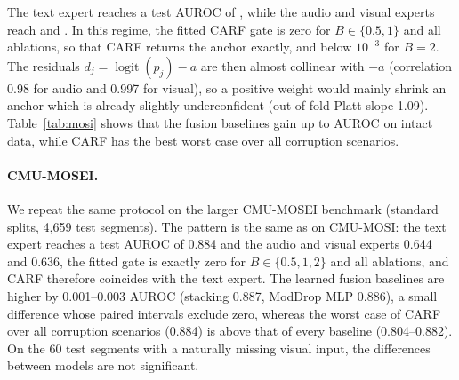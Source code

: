 \documentclass[runningheads]{llncs}
\newcommand{\logit}{\operatorname{logit}}
\begin{document}
The text expert reaches a test AUROC of \MosiText{}, while the audio and visual experts reach \MosiAudio{} and \MosiVisual{}. In this regime, the fitted CARF gate is zero for $B\in\{0.5,1\}$ and all ablations, so that CARF returns the anchor exactly, and below $10^{-3}$ for $B=2$. The residuals $d_j=\logit(p_j)-a$ are then almost collinear with $-a$ (correlation 0.98 for audio and 0.997 for visual), so a positive weight would mainly shrink an anchor which is already slightly underconfident (out-of-fold Platt slope 1.09). Table~\ref{tab:mosi} shows that the fusion baselines gain up to \MosiGap{} AUROC on intact data, while CARF has the best worst case over all corruption scenarios.

\begin{table}[h]
\centering
\caption{CMU-MOSI test results. Permuted: expert output permuted across segments (mean of 30 realizations). Worst case: lowest mean AUROC over the \MosiNScen{} corruption scenarios.}
\label{tab:mosi}
\small
{}
\end{table}

\paragraph{CMU-MOSEI.} We repeat the same protocol on the larger CMU-MOSEI benchmark (standard splits, 4{,}659 test segments). The pattern is the same as on CMU-MOSI: the text expert reaches a test AUROC of 0.884 and the audio and visual experts 0.644 and 0.636, the fitted gate is exactly zero for $B\in\{0.5,1,2\}$ and all ablations, and CARF therefore coincides with the text expert. The learned fusion baselines are higher by 0.001--0.003 AUROC (stacking 0.887, ModDrop MLP 0.886), a small difference whose paired intervals exclude zero, whereas the worst case of CARF over all corruption scenarios (0.884) is above that of every baseline (0.804--0.882). On the 60 test segments with a naturally missing visual input, the differences between models are not significant.
\end{document}

